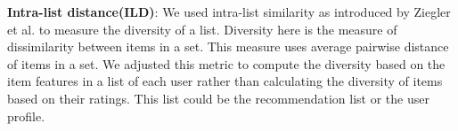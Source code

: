         
        
        
        
    

        \textbf{Intra-list distance(ILD)}: We used intra-list similarity as introduced by Ziegler et al. \cite{ziegler2005improving} to measure the diversity of a list. Diversity here is the measure of dissimilarity between items in a set. This measure uses average pairwise distance of items in a set. We adjusted this metric to compute the diversity based on the item features in a list of each user rather than calculating the diversity of items based on their ratings. This list could be the recommendation list or the user profile.
        
